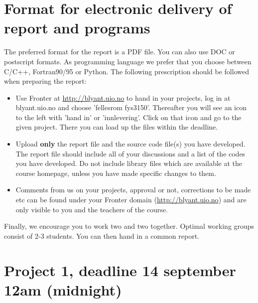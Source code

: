 \documentclass[11pt,a4wide]{article}
\begin{document}
\section*{Format for electronic delivery of report and programs}
%
The preferred format for the report is a PDF file. You can also
use DOC or postscript formats. 
As programming language we prefer that you choose between C/C++, Fortran90/95 or Python.
The following prescription should be followed when preparing the report:
\begin{itemize}
\item Use Fronter at \url{http://blyant.uio.no} to hand in your projects, log in  at 
blyant.uio.no and choose 'fellesrom fys3150'.
Thereafter you will see an icon to the left with 'hand in' or 'innlevering'.
Click on that icon and go to the given project. 
There you can load up the files within the deadline.
\item Upload {\bf only} the report file and the source code file(s) you have developed.
The report file should include all of your discussions and a list of the codes you have developed. 
Do not include library files which are available at the course homepage, unless you have
made specific changes to them.
\item Comments  from us on your projects, approval or not, corrections to be made 
etc can be found under
your Fronter domain (\url{http://blyant.uio.no}) and are only visible to you and the teachers of the course.
 
\end{itemize}
Finally, 
we encourage you to work two and two together. Optimal working groups consist of 
2-3 students. You can then hand in a common report. 

\section*{Project 1, deadline 14 september 12am (midnight)}
\end{document}
